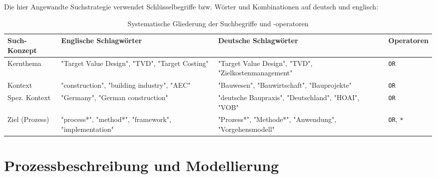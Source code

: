 Die hier Angewandte Suchstrategie verwendet Schlüsselbegriffe bzw. Wörter und Kombinationen auf deutsch und englisch:

\begin{table}[hbt!]
  \centering
  \caption{Systematische Gliederung der Suchbegriffe und -operatoren}
  \label{tab:suchstrategie}
  \begin{tabularx}{\textwidth}{l >{\raggedright\arraybackslash}X >{\raggedright\arraybackslash}X l}
    \toprule
    \textbf{Such-Konzept} & \textbf{Englische Schlagwörter} & \textbf{Deutsche Schlagwörter} & \textbf{Operatoren} \\
    \midrule
    Kernthema & "Target Value Design", "TVD", "Target Costing" & "Target Value Design", "TVD", "Zielkostenmanagement" & \texttt{OR} \\
    \addlinespace
    Kontext & "construction", "building industry", "AEC" & "Bauwesen", "Bauwirtschaft", "Bauprojekte" & \texttt{OR} \\
    \addlinespace
    Spez. Kontext & "Germany", "German construction" & "deutsche Baupraxis", "Deutschland", "HOAI", "VOB" & \texttt{OR} \\
    \addlinespace
    Ziel (Prozess) & "process*", "method*", "framework", "implementation" & "Prozess*", "Methode*", "Anwendung", "Vorgehensmodell" & \texttt{OR}, \texttt{*} \\
    \bottomrule
  \end{tabularx}
\end{table}


\FloatBarrier

\section{Prozessbeschreibung und Modellierung}
\label{sec: 3.3}


